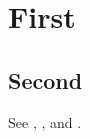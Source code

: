 \documentclass{article}
\begin{document}
\section{First}\label{sec:a}
\subsection{Second}\label{sec:b}
See , , and .
\end{document}
